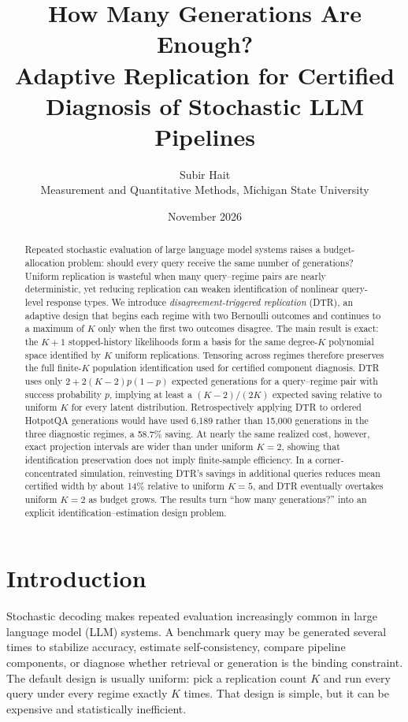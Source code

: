 \documentclass[11pt]{article}
\title{How Many Generations Are Enough?\\Adaptive Replication for Certified Diagnosis of Stochastic LLM Pipelines}
\author{Subir Hait\\Measurement and Quantitative Methods, Michigan State University}
\date{November 2026}
\theoremstyle{remark}
\begin{document}
\maketitle

\begin{abstract}
Repeated stochastic evaluation of large language model systems raises a budget-allocation problem: should every query receive the same number of generations? Uniform replication is wasteful when many query--regime pairs are nearly deterministic, yet reducing replication can weaken identification of nonlinear query-level response types. We introduce \emph{disagreement-triggered replication} (DTR), an adaptive design that begins each regime with two Bernoulli outcomes and continues to a maximum of $K$ only when the first two outcomes disagree. The main result is exact: the $K+1$ stopped-history likelihoods form a basis for the same degree-$K$ polynomial space identified by $K$ uniform replications. Tensoring across regimes therefore preserves the full finite-$K$ population identification used for certified component diagnosis. DTR uses only $2+2(K-2)p(1-p)$ expected generations for a query--regime pair with success probability $p$, implying at least a $(K-2)/(2K)$ expected saving relative to uniform $K$ for every latent distribution. Retrospectively applying DTR to ordered HotpotQA generations would have used 6,189 rather than 15,000 generations in the three diagnostic regimes, a 58.7\% saving. At nearly the same realized cost, however, exact projection intervals are wider than under uniform $K=2$, showing that identification preservation does not imply finite-sample efficiency. In a corner-concentrated simulation, reinvesting DTR's savings in additional queries reduces mean certified width by about 14\% relative to uniform $K=5$, and DTR eventually overtakes uniform $K=2$ as budget grows. The results turn ``how many generations?'' into an explicit identification--estimation design problem.
\end{abstract}

\section{Introduction}

Stochastic decoding makes repeated evaluation increasingly common in large language model (LLM) systems. A benchmark query may be generated several times to stabilize accuracy, estimate self-consistency, compare pipeline components, or diagnose whether retrieval or generation is the binding constraint. The default design is usually uniform: pick a replication count $K$ and run every query under every regime exactly $K$ times. That design is simple, but it can be expensive and statistically inefficient.
\end{document}
